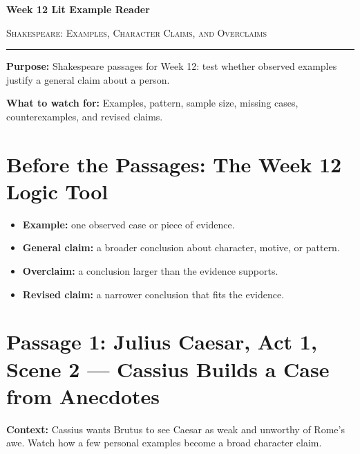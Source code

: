 \documentclass[12pt]{article}
\begin{document}
\begin{center}
{\LARGE\bfseries Week 12 Lit Example Reader}\par\vspace{0.02em}
{\large\scshape Shakespeare: Examples, Character Claims, and Overclaims}\par\vspace{0.06em}
\rule{0.78\textwidth}{0.5pt}
\end{center}

\textbf{Purpose:} Shakespeare passages for Week 12: test whether observed examples justify a general claim about a person.

\textbf{What to watch for:} Examples, pattern, sample size, missing cases, counterexamples, and revised claims.

\section*{Before the Passages: The Week 12 Logic Tool}

\begin{itemize}[leftmargin=1.3em,itemsep=0.05em,topsep=0.08em,parsep=0.03em]
\item \textbf{Example:} one observed case or piece of evidence.
\item \textbf{General claim:} a broader conclusion about character, motive, or pattern.
\item \textbf{Overclaim:} a conclusion larger than the evidence supports.
\item \textbf{Revised claim:} a narrower conclusion that fits the evidence.
\end{itemize}

\section*{Passage 1: Julius Caesar, Act 1, Scene 2 --- Cassius Builds a Case from Anecdotes}

\textbf{Context:} Cassius wants Brutus to see Caesar as weak and unworthy of Rome's awe. Watch how a few personal examples become a broad character claim.
\end{document}
